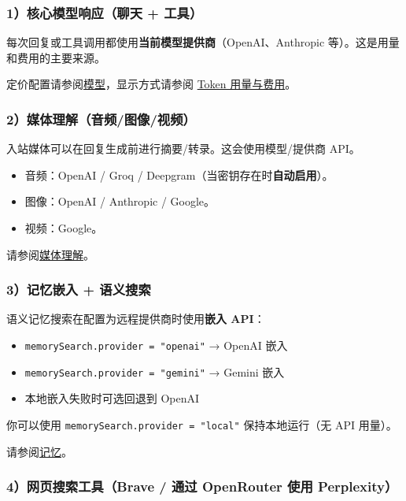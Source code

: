 \subsubsection{1）核心模型响应（聊天 + 工具）}


每次回复或工具调用都使用\textbf{当前模型提供商}（OpenAI、Anthropic 等）。这是用量和费用的主要来源。

定价配置请参阅\href{/providers/models}{模型}，显示方式请参阅 \href{/reference/token-use}{Token 用量与费用}。

\subsubsection{2）媒体理解（音频/图像/视频）}


入站媒体可以在回复生成前进行摘要/转录。这会使用模型/提供商 API。

\begin{itemize}
  \item 音频：OpenAI / Groq / Deepgram（当密钥存在时\textbf{自动启用}）。
  \item 图像：OpenAI / Anthropic / Google。
  \item 视频：Google。
\end{itemize}


请参阅\href{/nodes/media-understanding}{媒体理解}。

\subsubsection{3）记忆嵌入 + 语义搜索}


语义记忆搜索在配置为远程提供商时使用\textbf{嵌入 API}：

\begin{itemize}
  \item \texttt{memorySearch.provider = "openai"} → OpenAI 嵌入
  \item \texttt{memorySearch.provider = "gemini"} → Gemini 嵌入
  \item 本地嵌入失败时可选回退到 OpenAI
\end{itemize}


你可以使用 \texttt{memorySearch.provider = "local"} 保持本地运行（无 API 用量）。

请参阅\href{/concepts/memory}{记忆}。

\subsubsection{4）网页搜索工具（Brave / 通过 OpenRouter 使用 Perplexity）}


